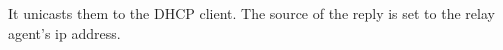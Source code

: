 It unicasts them to the DHCP client. The source of the reply is set to the relay agent's ip address.